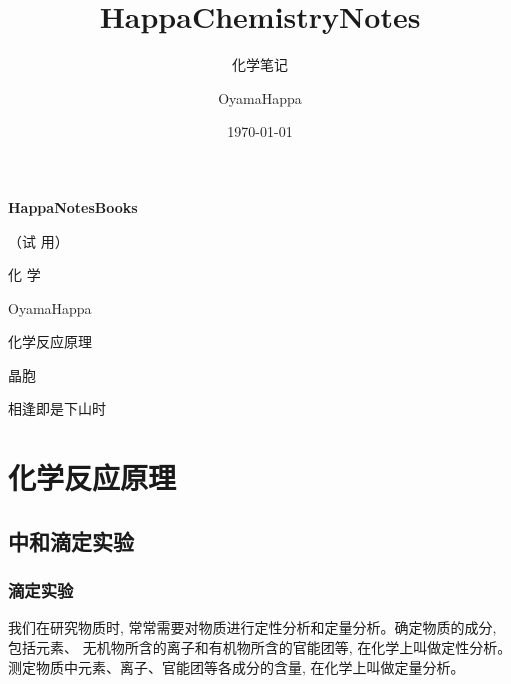 \documentclass[10pt,cn]{elegantbook}
\title{HappaChemistryNotes}
\subtitle{化学笔记}
\author{OyamaHappa}
\date{\today}
\begin{document}
	
	\begin{titlepage}
		\begin{center}
			\vspace*{3cm}
			
			{\Large \textbf{HappaNotesBooks} }
			
			{\Large（试 用）}
			
			\vspace{1cm}
			
			{\Huge 化 \qquad 学}
			
			\vspace{0.5cm}
			
			
			
			
			
			
			\vspace{1cm}
			
		OyamaHappa

			
			\vspace{5cm}
			化学反应原理
			
			晶胞
			
						
			\vfill
			
			相逢即是下山时
			
			
			
		\end{center}
	\end{titlepage}
	
	
	\tableofcontents
	
	\mainmatter

	\part{化学反应原理}
    \chapter{中和滴定实验}
	\section{滴定实验}
	
	我们在研究物质时, 常常需要对物质进行定性分析和定量分析。确定物质的成分, 包括元素、 无机物所含的离子和有机物所含的官能团等, 在化学上叫做定性分析。测定物质中元素、离子、官能团等各成分的含量, 在化学上叫做定量分析。
	
	
\end{document}
